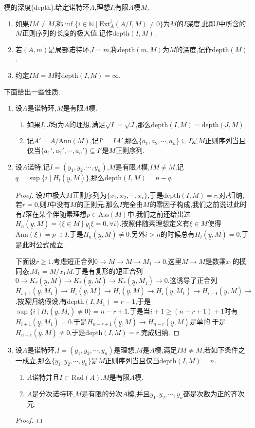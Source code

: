 模的深度(depth).给定诺特环$A$,理想$I$,有限$A$模$M$,
\begin{enumerate}
	\item 如果$IM\not=M$,称$\inf\{i\in\mathbb{N}\mid\mathrm{Ext}^i_A(A/I,M)\not=0\}$为$M$的$I$深度,此即$I$中所含的$M$正则序列的长度的极大值.记作$\mathrm{depth}(I,M)$.
	\item 若$(A,m)$是局部诺特环,$I=m$,称$\mathrm{depth}(m,M)$为$M$的深度,记作$\mathrm{depth}(M)$.
	\item 约定$IM=M$时$\mathrm{depth}(I,M)=\infty$.
\end{enumerate}

下面给出一些性质.
\begin{enumerate}
	\item 设$A$是诺特环,$M$是有限$A$模.
	\begin{enumerate}
		\item 如果$I,J$均为$A$的理想,满足$\sqrt{I}=\sqrt{J}$,那么$\mathrm{depth}(I,M)=\mathrm{depth}(J,M)$.
		\item 记$A'=A/\mathrm{Ann}(M)$,记$I'=IA'$,那么$\{a_1,a_2,\cdots,a_n\}\subseteq I$是$M$正则序列当且仅当$\{a_1',a_2',\cdots,a_n'\}\subseteq I'$是$M$正则序列.
	\end{enumerate}
	\item 设$A$诺特,记$I=(y_1,y_2,\cdots,y_n)$,$M$是有限$A$模,$IM\not=M$,记$q=\sup\{i\mid H_i(\underline{y},M)\}$,那么$\mathrm{depth}(I,M)=n-q$.
	\begin{proof}
		
		设$I$中极大$M$正则序列为$\{x_1,x_2,\cdots,x_r\}$,于是$\mathrm{depth}(I,M)=r$.对$r$归纳,若$r=0$,则$I$中没有$M$的正则元,那么$I$完全由$M$的零因子构成,我们之前说过此时有$I$落在某个伴随素理想$p\in\mathrm{Ass}(M)$中.我们之前还给出过$H_n(\underline{y},M)=\{\xi\in M\mid y_i\xi=0,\forall i\}$.按照伴随素理想定义有$\xi\in M$使得$\mathrm{Ann}(\xi)=p\supset I$.于是$H_n(\underline{y},M)\not=0$.另外$i>n$的时候总有$H_i(\underline{y},M)=0$.于是此时公式成立.
		
		下面设$r\ge1$.考虑短正合列$0\to M\to M\to M_1\to0$,这里$M\to M$是数乘$x_1$的模同态,$M_1=M/x_1M$.于是有复形的短正合列$0\to K_*(\underline{y},M)\to K_*(\underline{y},M)\to K_*(\underline{y},M_1)\to0$.这诱导了正合列$H_{i+1}(\underline{y},M_1)\to H_i(\underline{y},M)\to H_i(\underline{y},M)\to H_i(\underline{y},M_1)\to H_{i-1}(\underline{y},M)\to$.按照归纳假设,有$\mathrm{depth}(I,M_1)=r-1$,于是$\sup\{i\mid H_i(\underline{y},M_i)\not=0\}=n-r+1$.于是当$i+1\ge(n-r+1)+1$时有$H_{i+1}(\underline{y},M_1)=0$.于是$H_{n-r+1}(\underline{y},M)\to H_{n-r}(\underline{y},M)$是单的.于是$H_{n-r}(\underline{y},M)\not=0$,于是$\mathrm{depth}(I,M)=r$.完成归纳.
	\end{proof}
	\item 设$A$是诺特环,$I=(y_1,y_2,\cdots,y_n)$是理想,$M$是$A$模,满足$IM\not=M$,若如下条件之一成立,那么$\{y_1,y_2,\cdots,y_n\}$是$M$正则序列当且仅当$\mathrm{depth}(I,M)=n$.
	\begin{enumerate}
		\item $A$诺特并且$I\subset\mathrm{Rad}(A)$,$M$是有限$A$模.
		\item $A$是分次诺特环,$M$是有限的分次$A$模,并且$y_1,y_2,\cdots,y_n$都是次数为正的齐次元.
	\end{enumerate}
	\begin{proof}
		

\end{proof}
\end{enumerate}
